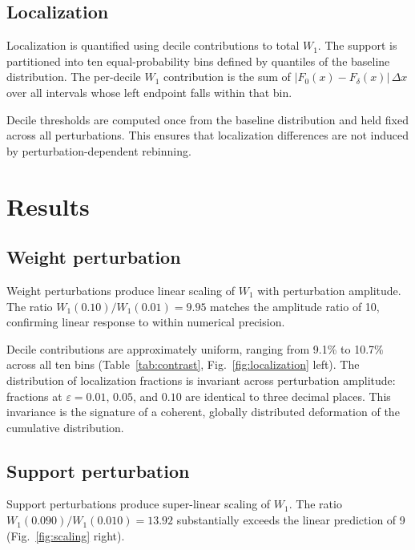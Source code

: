 \documentclass[a4paper,fleqn,usenatbib]{mnras}
\begin{document}
\subsection{Localization}
\label{sec:localization}

Localization is quantified using decile contributions to total $W_1$. The
support is partitioned into ten equal-probability bins defined by quantiles of
the baseline distribution. The per-decile $W_1$ contribution is the sum of
$|F_0(x) - F_\delta(x)|\,\Delta x$ over all intervals whose left endpoint
falls within that bin.

Decile thresholds are computed once from the baseline distribution and held
fixed across all perturbations. This ensures that localization differences are
not induced by perturbation-dependent rebinning.

\section{Results}
\label{sec:results}

\subsection{Weight perturbation}
\label{sec:res_weight}

Weight perturbations produce linear scaling of $W_1$ with perturbation
amplitude. The ratio $W_1(0.10)/W_1(0.01) = 9.95$ matches the amplitude ratio
of 10, confirming linear response to within numerical precision.

Decile contributions are approximately uniform, ranging from 9.1\% to 10.7\%
across all ten bins (Table~\ref{tab:contrast}, Fig.~\ref{fig:localization}
left). The distribution of localization fractions is invariant across
perturbation amplitude: fractions at $\varepsilon = 0.01$, $0.05$, and $0.10$
are identical to three decimal places. This invariance is the signature of a
coherent, globally distributed deformation of the cumulative distribution.

\subsection{Support perturbation}
\label{sec:res_support}

Support perturbations produce super-linear scaling of $W_1$. The ratio
$W_1(0.090)/W_1(0.010) = 13.92$ substantially exceeds the linear prediction
of 9 (Fig.~\ref{fig:scaling} right).
\end{document}
